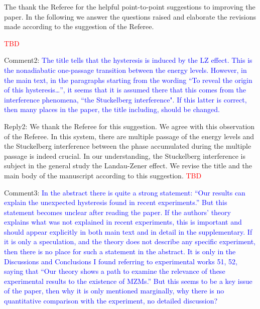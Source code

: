 \documentclass[onecolumn,preprintnumbers,amsmath,amssymb,prb]{revtex4}
\newcommand{\red}[1]{\textcolor{red}{#1}}
\newcommand{\blue}[1]{\textcolor{blue}{#1}}
\begin{document}
The thank the Referee for the helpful point-to-point suggestions to improving the paper. In the following we answer the questions raised and elaborate the revisions made according to the suggestion of the Referee.




\red{TBD}

\vspace{5mm}

\noindent Comment2: 
\blue{The title tells that the hysteresis is induced by the LZ effect. This
is the nonadiabatic one-passage transition between the energy levels.
However, in the main text, in the paragraphs starting from the wording
“To reveal the origin of this hysteresis…”, it seems that it is
assumed there that this comes from the interference phenomena, “the
Stuckelberg interference". If this latter is correct, then many places
in the paper, the title including, should be changed.}

\vspace{5mm}

\noindent Reply2: We thank the Referee for this suggestion. We agree with this observation of the Referee. In this system, there are multiple passage of the energy levels and the Stuckelberg interference between the phase accumulated during the multiple passage is indeed crucial. In our understanding, the Stuckelberg interference is subject in the general study the Landau-Zener effect. We revise the title and the main body of the manuscript  according to this suggestion.  \red{TBD}

\vspace{5mm}

\noindent Comment3: 
\blue{In the abstract there is quite a strong statement: “Our results can
explain the unexpected hysteresis found in recent experiments.” But
this statement becomes unclear after reading the paper. If the
authors’ theory explains what was not explained in recent experiments,
this is important and should appear explicitly in both main text and
in detail in the supplementary. If it is only a speculation, and the
theory does not describe any specific experiment, then there is no
place for such a statement in the abstract. It is only in the
Discussions and Conclusions I found referring to experimental works
51, 52, saying that “Our theory shows a path to examine the relevance
of these experimental results to the existence of MZMs.” But this
seems to be a key issue of the paper, then why it is only mentioned
marginally, why there is no quantitative comparison with the
experiment, no detailed discussion?}
\end{document}
